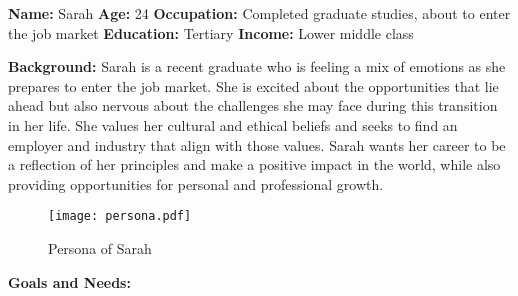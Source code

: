 \noindent \textbf{Name:} Sarah
\newline\noindent\textbf{Age:} 24
\newline\noindent\textbf{Occupation:} Completed graduate studies, about to enter the job market
\newline\noindent\textbf{Education:} Tertiary
\newline\noindent\textbf{Income:} Lower middle class

\noindent\textbf{Background:} Sarah is a recent graduate who is feeling a mix of emotions as she prepares to enter the job market.
She is excited about the opportunities that lie ahead but also nervous about the challenges she may face during this transition in
her life. She values her cultural and ethical beliefs and seeks to find an employer and industry that align with those values. Sarah
wants her career to be a reflection of her principles and make a positive impact in the world, while also providing opportunities for
personal and professional growth.

\begin{figure}[h!]
    \centering
    \caption{Persona of Sarah}
    \label{fig:persona}
    \texttt{[image: persona.pdf]}
\end{figure}

\noindent\textbf{Goals and Needs:}


